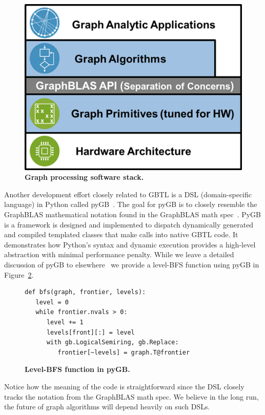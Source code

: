 \begin{figure}[t]
\includegraphics[width=\linewidth]{fig/gbtl}
\caption{\textbf{Graph processing software stack.}\label{fig:gbtl}}
\end{figure}


Another development effort closely related to GBTL is a DSL (domain-specific language) in Python called pyGB~\cite{Chamberlin2016}.  
The goal for pyGB is to closely resemble the GraphBLAS mathematical notation found in the GraphBLAS math spec~\cite{mathgraphblas16}.  
PyGB is a framework is designed and implemented to dispatch dynamically generated and compiled templated 
classes that make calls into native GBTL code.  It demonstrates how Python's syntax and dynamic execution provides 
a high-level abstraction with minimal performance penalty.  While we leave a detailed discussion of pyGB to elsewhere~\cite{Chamberlin2016}
we provide a level-BFS function using pyGB in Figure~\ref{code:pyGB}.
%
\begin{figure}[t]
{\small
\begin{verbatim}
def bfs(graph, frontier, levels):
   level = 0
   while frontier.nvals > 0:
      level += 1
      levels[front][:] = level
      with gb.LogicalSemiring, gb.Replace:
         frontier[~levels] = graph.T@frontier
\end{verbatim}
}
\caption{\textbf{Level-BFS function in pyGB.}\label{code:pyGB}}
\end{figure}
%
%
%
Notice how the meaning of the code
is straightforward since the DSL closely tracks the notation from the GraphBLAS math spec.  We believe in the long run, the 
future of graph algorithms will depend heavily on such DSLs.

